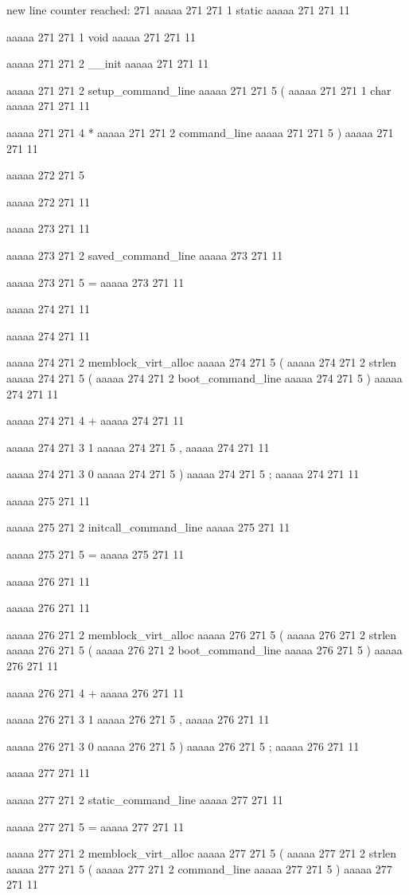 new line counter reached: 271
aaaaa 271 271
1
static
aaaaa 271 271
11
 
aaaaa 271 271
1
void
aaaaa 271 271
11
 
aaaaa 271 271
2
__init
aaaaa 271 271
11
 
aaaaa 271 271
2
setup_command_line
aaaaa 271 271
5
(
aaaaa 271 271
1
char
aaaaa 271 271
11
 
aaaaa 271 271
4
*
aaaaa 271 271
2
command_line
aaaaa 271 271
5
)
aaaaa 271 271
11


aaaaa 272 271
5
{
aaaaa 272 271
11


aaaaa 273 271
11
	
aaaaa 273 271
2
saved_command_line
aaaaa 273 271
11
 
aaaaa 273 271
5
=
aaaaa 273 271
11


aaaaa 274 271
11
	
aaaaa 274 271
11
	
aaaaa 274 271
2
memblock_virt_alloc
aaaaa 274 271
5
(
aaaaa 274 271
2
strlen
aaaaa 274 271
5
(
aaaaa 274 271
2
boot_command_line
aaaaa 274 271
5
)
aaaaa 274 271
11
 
aaaaa 274 271
4
+
aaaaa 274 271
11
 
aaaaa 274 271
3
1
aaaaa 274 271
5
,
aaaaa 274 271
11
 
aaaaa 274 271
3
0
aaaaa 274 271
5
)
aaaaa 274 271
5
;
aaaaa 274 271
11


aaaaa 275 271
11
	
aaaaa 275 271
2
initcall_command_line
aaaaa 275 271
11
 
aaaaa 275 271
5
=
aaaaa 275 271
11


aaaaa 276 271
11
	
aaaaa 276 271
11
	
aaaaa 276 271
2
memblock_virt_alloc
aaaaa 276 271
5
(
aaaaa 276 271
2
strlen
aaaaa 276 271
5
(
aaaaa 276 271
2
boot_command_line
aaaaa 276 271
5
)
aaaaa 276 271
11
 
aaaaa 276 271
4
+
aaaaa 276 271
11
 
aaaaa 276 271
3
1
aaaaa 276 271
5
,
aaaaa 276 271
11
 
aaaaa 276 271
3
0
aaaaa 276 271
5
)
aaaaa 276 271
5
;
aaaaa 276 271
11


aaaaa 277 271
11
	
aaaaa 277 271
2
static_command_line
aaaaa 277 271
11
 
aaaaa 277 271
5
=
aaaaa 277 271
11
 
aaaaa 277 271
2
memblock_virt_alloc
aaaaa 277 271
5
(
aaaaa 277 271
2
strlen
aaaaa 277 271
5
(
aaaaa 277 271
2
command_line
aaaaa 277 271
5
)
aaaaa 277 271
11
 
}
